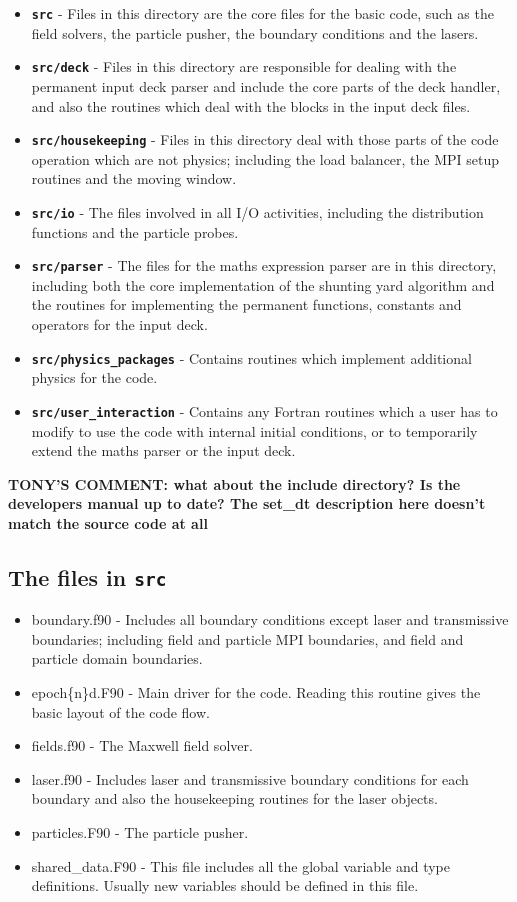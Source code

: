 \documentclass[12pt,a4paper]{article}
\newcommand{\inlinecode}[1]{{\color{warwickred} \bf\texttt{#1}}}
\newcommand{\EPOCH}{{\color{warwickdark}\fontfamily{phv}\selectfont{EPOCH}}}
\newcommand{\tony}[1]{{\color{warwickred} \bf{TONY'S COMMENT:} \bf{#1}}\\}
\begin{document}
\begin{itemize}
\item \inlinecode{src} - Files in this directory are the core files for the
  basic {\EPOCH} code, such as the field solvers, the particle pusher, the
  boundary conditions and the lasers.
\item \inlinecode{src/deck} - Files in this directory are responsible for
  dealing with the permanent input deck parser and include the core parts of
  the deck handler, and also the routines which deal with the blocks in the
  input deck files.
\item \inlinecode{src/housekeeping} - Files in this directory deal with those
  parts of the code operation which are not physics; including the load
  balancer, the MPI setup routines and the moving window.
\item \inlinecode{src/io} - The files involved in all I/O activities, including
  the distribution functions and the particle probes.
\item \inlinecode{src/parser} - The files for the maths expression parser are
  in this directory, including both the core implementation of the shunting yard
  algorithm and the routines for implementing the permanent functions,
  constants and operators for the input deck.
\item \inlinecode{src/physics\_packages} - Contains routines which implement
  additional physics for the code.
\item \inlinecode{src/user\_interaction} - Contains any Fortran routines which
  a user has to modify to use the code with internal initial conditions, or to
  temporarily extend the maths parser or the input deck.
\end{itemize}

\tony{what about the include directory? Is the developers manual up to date? The set\_dt description here doesn't match the source code at all}

\subsection{The files in \inlinecode{src}}
\begin{itemize}
\item boundary.f90 - Includes all boundary conditions except laser and
  transmissive boundaries; including field and particle MPI boundaries, and
  field and particle domain boundaries.
\item epoch\{n\}d.F90 - Main driver for the code. Reading this routine gives
  the basic layout of the code flow.
\item fields.f90 - The Maxwell field solver.
\item laser.f90 - Includes laser and transmissive boundary conditions for each
  boundary and also the housekeeping routines for the laser objects.
\item particles.F90 - The particle pusher.
\item shared\_data.F90 - This file includes all the global variable and type
  definitions. Usually new variables should be defined in this file.
\end{itemize}
\end{document}

